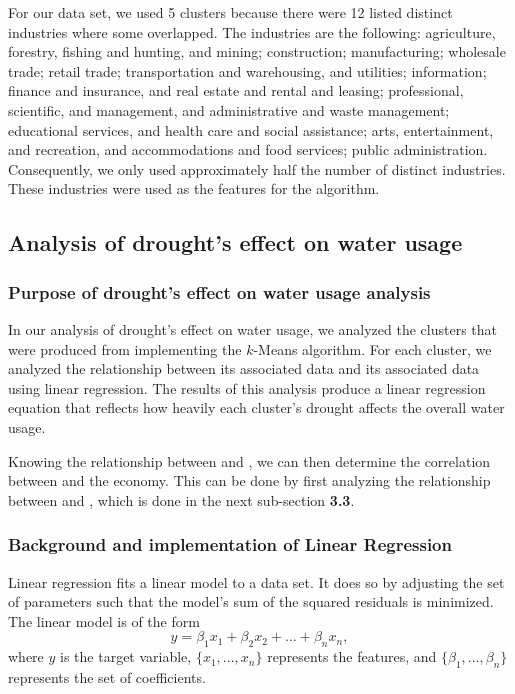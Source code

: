 \documentclass{article}
\begin{document}
For our data set, we used 5 clusters because there were 12 listed distinct industries where some overlapped. The industries are the following: agriculture, forestry, fishing and hunting, and mining; construction; manufacturing; wholesale trade; retail trade; transportation and warehousing, and utilities; information; finance and insurance, and real estate and rental and leasing; professional, scientific, and management, and administrative and waste management; educational services, and health care and social assistance; arts, entertainment, and recreation, and accommodations and food services; public administration. Consequently,  we only used approximately half the number of distinct industries. These industries were used as the features for the algorithm.

\subsection{Analysis of drought's effect on water usage}
\subsubsection{Purpose of drought's effect on water usage analysis}
In our analysis of drought's effect on water usage, we analyzed the clusters that were produced from implementing the $k$-Means algorithm. For each cluster, we analyzed the relationship between its associated  data and its associated  data using linear regression. The results of this analysis produce a linear regression equation that reflects how heavily each cluster's drought affects the overall water usage.

Knowing the relationship between  and , we can then determine the correlation between  and the economy. This can be done by first analyzing the relationship between  and , which is done in the next sub-section \textbf{3.3}.

\subsubsection{Background and implementation of Linear Regression}
Linear regression fits a linear model to a data set. It does so by adjusting the set of parameters such that the model's sum of the squared residuals is minimized. The linear model is of the form
\begin{equation}
    y=\beta_1x_1+\beta_2x_2+...+\beta_nx_n,
\end{equation}
where $y$ is the target variable, $\{x_1,...,x_n\}$ represents the features, and $\{\beta_1,...,\beta_n\}$ represents the set of coefficients.\cite{sklearn:2019}
\end{document}
